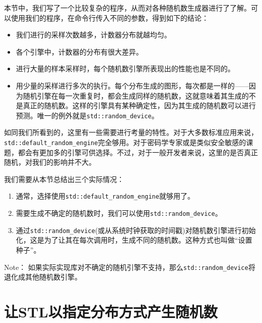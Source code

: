 本节中，我们写了一个比较复杂的程序，从而对各种随机数生成器进行了了解。可以使用我们的程序，在命令行传入不同的参数，得到如下的结论：

\begin{itemize}
\item 我们进行的采样次数越多，计数器分布就越均匀。

\item 各个引擎中，计数器的分布有很大差异。

\item 进行大量的样本采样时，每个随机数引擎所表现出的性能也是不同的。

\item 用少量的采样进行多次的执行。每个分布生成的图形，每次都是一样的——因为随机引擎在每一次重复时，都会生成同样的随机数，这就意味着其生成的不是真正的随机数。这样的引擎具有某种确定性，因为其生成的随机数可以进行预测。唯一的例外就是\texttt{std::random\_device}。

\end{itemize}

如同我们所看到的，这里有一些需要进行考量的特性。对于大多数标准应用来说，\texttt{std::default\_random\_engine}完全够用。对于密码学专家或是类似安全敏感的课题，都会有更加多的引擎可供选择。不过，对于一般开发者来说，这里的是否真正随机，对我们的影响并不大。

我们需要从本节总结出三个实际情况：

\begin{enumerate}
\item 通常，选择使用\texttt{std::default\_random\_engine}就够用了。

\item 需要生成不确定的随机数时，我们可以使用\texttt{std::random\_device}。

\item 通过\texttt{std::random\_device}(或从系统时钟获取的时间戳)对随机数引擎进行初始化，这是为了让其在每次调用时，生成不同的随机数。这种方式也叫做“设置种子”。

\end{enumerate}

\begin{myInfoBox}
Note： 如果实际实现库对不确定的随机引擎不支持，那么\texttt{std::random\_device}将退化成其他随机数引擎。
\end{myInfoBox}


\section{让STL以指定分布方式产生随机数}


